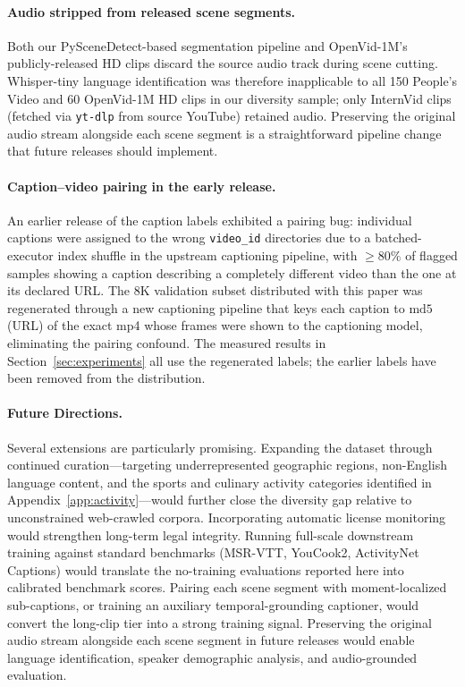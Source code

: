 \documentclass{article}
\begin{document}
\paragraph{Audio stripped from released scene segments.}
Both our PySceneDetect-based segmentation pipeline and OpenVid-1M's publicly-released HD clips discard the source audio track during scene cutting. Whisper-tiny language identification was therefore inapplicable to all 150 People's Video and 60 OpenVid-1M HD clips in our diversity sample; only InternVid clips (fetched via \texttt{yt-dlp} from source YouTube) retained audio. Preserving the original audio stream alongside each scene segment is a straightforward pipeline change that future releases should implement.

\paragraph{Caption--video pairing in the early release.}
An earlier release of the caption labels exhibited a pairing bug: individual captions were assigned to the wrong \texttt{video\_id} directories due to a batched-executor index shuffle in the upstream captioning pipeline, with $\geq 80\%$ of flagged samples showing a caption describing a completely different video than the one at its declared URL. The 8K validation subset distributed with this paper was regenerated through a new captioning pipeline that keys each caption to $\mathrm{md5}$(URL) of the exact mp4 whose frames were shown to the captioning model, eliminating the pairing confound. The measured results in Section~\ref{sec:experiments} all use the regenerated labels; the earlier labels have been removed from the distribution.

\paragraph{Future Directions.}
Several extensions are particularly promising. Expanding the dataset through continued curation---targeting underrepresented geographic regions, non-English language content, and the sports and culinary activity categories identified in Appendix~\ref{app:activity}---would further close the diversity gap relative to unconstrained web-crawled corpora. Incorporating automatic license monitoring would strengthen long-term legal integrity. Running full-scale downstream training against standard benchmarks (MSR-VTT, YouCook2, ActivityNet Captions) would translate the no-training evaluations reported here into calibrated benchmark scores. Pairing each scene segment with moment-localized sub-captions, or training an auxiliary temporal-grounding captioner, would convert the long-clip tier into a strong training signal. Preserving the original audio stream alongside each scene segment in future releases would enable language identification, speaker demographic analysis, and audio-grounded evaluation.

\newpage

\end{document}
